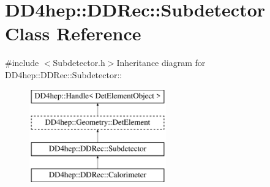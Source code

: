 \hypertarget{class_d_d4hep_1_1_d_d_rec_1_1_subdetector}{
\section{DD4hep::DDRec::Subdetector Class Reference}
\label{class_d_d4hep_1_1_d_d_rec_1_1_subdetector}
}


{\ttfamily \#include $<$Subdetector.h$>$}Inheritance diagram for DD4hep::DDRec::Subdetector::\begin{figure}[H]
\begin{center}
\leavevmode
\includegraphics[height=4cm]{class_d_d4hep_1_1_d_d_rec_1_1_subdetector}
\end{center}
\end{figure}
